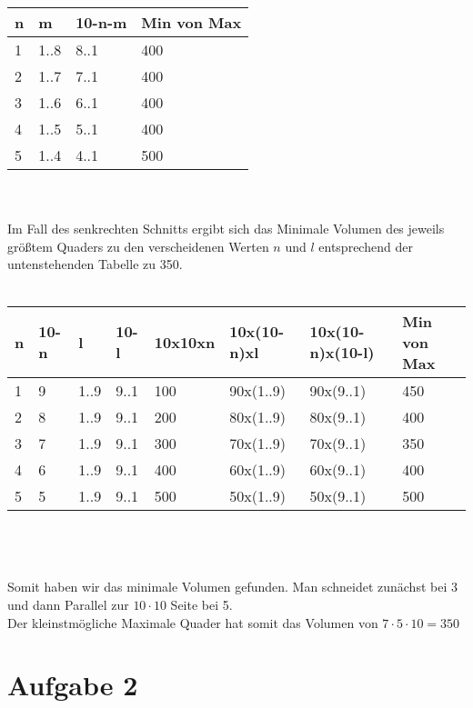 \documentclass{article}
\begin{document}
\begin{tabular}{l|l|l|l}
    n & m    & 10-n-m & Min von Max \\\hline
    1 & 1..8 & 8..1   & 400         \\\hline
    2 & 1..7 & 7..1   & 400         \\\hline
    3 & 1..6 & 6..1   & 400         \\\hline
    4 & 1..5 & 5..1   & 400         \\\hline
    5 & 1..4 & 4..1   & 500        
\end{tabular}
\\\\
Im Fall des senkrechten Schnitts ergibt sich das Minimale Volumen des jeweils größtem Quaders zu den verscheidenen Werten $n$ und $l$ entsprechend der untenstehenden Tabelle zu 350.
\\\\
\begin{tabular}{|l|l|l|l|l|l|l|l}
    n & 10-n & l    & 10-l & 10x10xn & 10x(10-n)xl & 10x(10-n)x(10-l) & Min von Max \\\hline
    1 & 9    & 1..9 & 9..1 & 100     & 90x(1..9)   & 90x(9..1)        & 450         \\\hline
    2 & 8    & 1..9 & 9..1 & 200     & 80x(1..9)   & 80x(9..1)        & 400         \\\hline
    3 & 7    & 1..9 & 9..1 & 300     & 70x(1..9)   & 70x(9..1)        & 350         \\\hline
    4 & 6    & 1..9 & 9..1 & 400     & 60x(1..9)   & 60x(9..1)        & 400         \\\hline
    5 & 5    & 1..9 & 9..1 & 500     & 50x(1..9)   & 50x(9..1)        & 500        
\end{tabular}
\\\\\\
Somit haben wir das minimale Volumen gefunden. Man schneidet zunächst bei 3 und dann Parallel zur $10 \cdot 10$ Seite bei 5. \\
Der kleinstmögliche Maximale Quader hat somit das Volumen von $7 \cdot 5 \cdot 10 = 350$
\section*{Aufgabe 2}
\end{document}
